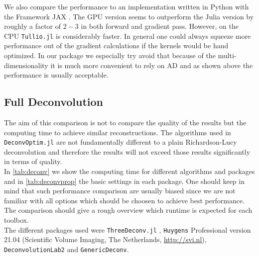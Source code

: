 \documentclass{juliacon}
\begin{document}
            We also compare the performance to an implementation written in Python with the Framework JAX \cite{jax2018github}. 
            The GPU version seems to outperform the Julia version by roughly a factor of $2 - 3$ in both forward and gradient pass.
            However, on the CPU \verb|Tullio.jl| is considerably faster. 
            In general one could always squeeze more performance out of the gradient calculations if the kernels would be hand optimized.
            In our package we especially try avoid that because of the multi-dimensionality it is much more convenient
            to rely on AD and as shown above the performance is usually acceptable.



    \subsection{Full Deconvolution}
        The aim of this comparison is not to compare the quality of the results but the computing time to achieve similar reconstructions. The algorithms used in \verb|DeconvOptim.jl| are not fundamentally different to a plain Richardson-Lucy deconvolution and therefore the results will 
        not exceed those results significantly in terms of quality.\\
        In \autoref{tab:deconv} we show the computing time for different algorithms and packages and in \autoref{tab:deconvprop} the basic settings
        in each package.
        One should keep in mind that such performance comparison are usually biased since we are not
        familiar with all options which should be choosen to achieve best performance.
        The comparison should give a rough overview which runtime is expected for each toolbox.\\
        The different packages used were \verb|ThreeDeconv.jl| \cite{ikoma2018convex}, \verb|Huygens| Professional version 21.04 (Scientific Volume Imaging, The Netherlands, \url{http://svi.nl}), \verb|DeconvolutionLab2| \cite{deconvlab2} and \verb|GenericDeconv|.  
\end{document}
